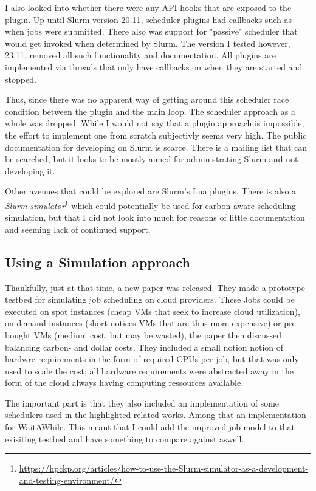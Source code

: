 I also looked into whether there were any API hooks that are exposed to the plugin. 
Up until Slurm version 20.11, scheduler plugins had callbacks such as when jobs were submitted. There also was support for "passive" scheduler that would get invoked when determined by Slurm.
The version I tested however,  23.11, removed all such functionality and documentation. All plugins are implemented via threads that only have callbacks on when they are started and stopped.

Thus, since there was no apparent way of getting around this scheduler race condition between the plugin and the main loop. 
The scheduler approach as a whole was dropped. 
While I would not say that a plugin approach is impossible, the effort to implement one from scratch subjectivly seems very high. 
The public documentation for developing on Slurm is scarce. 
There is a mailing list that can be searched, but it looks to be mostly aimed for administrating Slurm and not developing it.

Other avenues that could be explored are Slurm's Lua plugins. There is also a \emph{Slurm simulator}\footnote{\url{https://hpckp.org/articles/how-to-use-the-Slurm-simulator-as-a-development-and-testing-environment/}} which could potentially be used for carbon-aware scheduling simulation, but that I did not look into much for reasons of little documentation and seeming lack of continued support.

\subsection{Using a Simulation approach}

Thankfully, just at that time, a new paper \cite{hanafy_going_2024} was released. 
They made a prototype testbed for simulating job scheduling on cloud providers. These Jobs could be executed on spot instances (cheap VMs that seek to increase cloud utilization), on-demand instances (short-notices VMs that are thus more expensive) or pre bought VMs (medium cost, but may be wasted), the paper then discussed balancing carbon- and dollar costs. 
They included a small notion notion of hardwre requirements in the form of required CPUs per job, but that was only used to scale the cost; all hardware requirements were abstracted away in the form of the cloud always having computing ressources available.

The important part is that they also included an implementation of some schedulers used in the highlighted related works. Among that an implementation for WaitAWhile\cite{wiesner_lets_2021}.
This meant that I could add the improved job model to that exisiting testbed and have something to compare against aswell.

